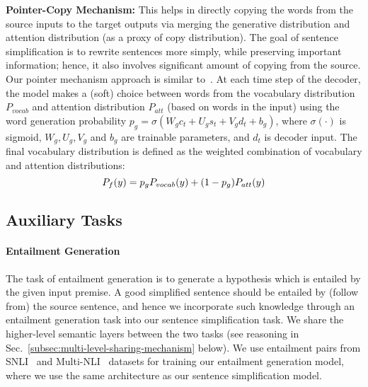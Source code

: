 \documentclass[11pt]{article}
\begin{document}
\noindent\textbf{Pointer-Copy Mechanism:} This helps in directly copying the words from the source inputs to the target outputs via merging the generative distribution and attention distribution (as a proxy of copy distribution). The goal of sentence simplification is to rewrite sentences more simply, while preserving important information; hence, it also involves significant amount of copying from the source. Our pointer mechanism approach is similar to~. At each time step of the decoder, the model makes a (soft) choice between words from the vocabulary distribution $P_{vocab}$ and attention distribution $P_{att}$ (based on words in the input) using the word generation probability $p_g = \sigma (W_g c_t + U_g s_t + V_g d_t + b_g)$, where $\sigma (\cdot)$ is sigmoid, $W_g, U_g, V_g$ and $b_g$ are trainable parameters, and $d_t$ is decoder input. The final vocabulary distribution is defined as the weighted combination of vocabulary and attention distributions:
\vspace{-5pt}
\begin{equation}
P_f (y) = p_g P_{vocab} (y) + (1 - p_g) P_{att} (y)
\vspace{-5pt}
\end{equation}



\subsection{Auxiliary Tasks}

\paragraph{Entailment Generation} 
The task of entailment generation is to generate a hypothesis which is entailed by the given input premise. A good simplified sentence should be entailed by (follow from) the source sentence, and hence we incorporate such knowledge through an entailment generation task into our sentence simplification task. We share the higher-level semantic layers between the two tasks (see reasoning in Sec.~\ref{subsec:multi-level-sharing-mechanism} below). We use entailment pairs from SNLI~\cite{bowman2016snli} and Multi-NLI~\cite{williams2017broad} datasets for training our entailment generation model, where we use the same architecture as our sentence simplification model.
\end{document}
